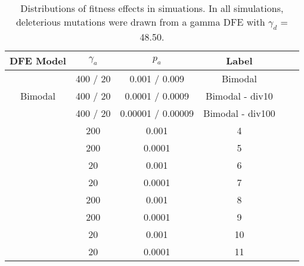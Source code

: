 


\begin{table}
\caption{Distributions of fitness effects in simuations. In all simulations, deleterious mutations were drawn from a gamma DFE with $\gamma_d$ = 48.50.}
 \begin{tabular}{c c c c c c} 

  \hline
  DFE Model & $\gamma_a$ & $p_a$ & Label \\ [0.5ex] 
 \hline
 \multirow{3}{*}{Bimodal} & 400 / 20 & 0.001 / 0.009 & Bimodal \\
 						 & 400 / 20 & 0.0001 / 0.0009 & Bimodal - div10 \\
 						 & 400 / 20  & 0.00001 / 0.00009  & Bimodal - div100 \\
 \hdashline
 \multirow{4}{*}{Exponential} & 200 & 0.001 & 4 \\
 						  & 200 & 0.0001 & 5 \\
 						  & 20 & 0.001 & 6 \\
 						  & 20 & 0.0001 & 7 \\
  \hdashline						 
  \multirow{4}{*}{Fixed} & 200 & 0.001 & 8 \\
 						  & 200 & 0.0001 & 9 \\
 						  & 20 & 0.001 & 10 \\
 						  & 20 & 0.0001 & 11 \\
\hline
\end{tabular}    

\end{table}
